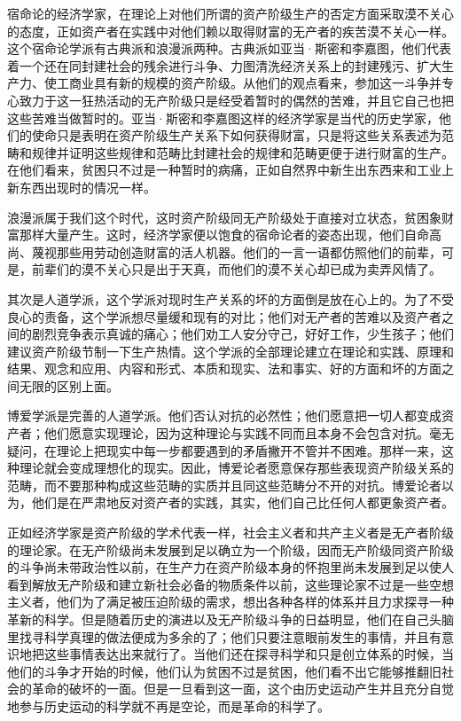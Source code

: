 \documentclass[a4paper,twoside,12pt]{ctexart}
\begin{document}
宿命论的经济学家，在理论上对他们所谓的资产阶级生产的否定方面采取漠不关心的态度，正如资产者在实践中对他们赖以取得财富的无产者的疾苦漠不关心一样。这个宿命论学派有古典派和浪漫派两种。古典派如亚当·斯密和李嘉图，他们代表着一个还在同封建社会的残余进行斗争、力图清洗经济关系上的封建残污、扩大生产力、使工商业具有新的规模的资产阶级。从他们的观点看来，参加这一斗争并专心致力于这一狂热活动的无产阶级只是经受着暂时的偶然的苦难，并且它自己也把这些苦难当做暂时的。亚当·斯密和李嘉图这样的经济学家是当代的历史学家，他们的使命只是表明在资产阶级生产关系下如何获得财富，只是将这些关系表述为范畴和规律并证明这些规律和范畴比封建社会的规律和范畴更便于进行财富的生产。在他们看来，贫困只不过是一种暂时的病痛，正如自然界中新生出东西来和工业上新东西出现时的情况一样。

浪漫派属于我们这个时代，这时资产阶级同无产阶级处于直接对立状态，贫困象财富那样大量产生。这时，经济学家便以饱食的宿命论者的姿态出现，他们自命高尚、蔑视那些用劳动创造财富的活人机器。他们的一言一语都仿照他们的前辈，可是，前辈们的漠不关心只是出于天真，而他们的漠不关心却已成为卖弄风情了。

其次是人道学派，这个学派对现时生产关系的坏的方面倒是放在心上的。为了不受良心的责备，这个学派想尽量缓和现有的对比；他们对无产者的苦难以及资产者之间的剧烈竞争表示真诚的痛心；他们劝工人安分守己，好好工作，少生孩子；他们建议资产阶级节制一下生产热情。这个学派的全部理论建立在理论和实践、原理和结果、观念和应用、内容和形式、本质和现实、法和事实、好的方面和坏的方面之间无限的区别上面。

博爱学派是完善的人道学派。他们否认对抗的必然性；他们愿意把一切人都变成资产者；他们愿意实现理论，因为这种理论与实践不同而且本身不会包含对抗。毫无疑问，在理论上把现实中每一步都要遇到的矛盾撇开不管并不困难。那样一来，这种理论就会变成理想化的现实。因此，博爱论者愿意保存那些表现资产阶级关系的范畴，而不要那种构成这些范畴的实质并且同这些范畴分不开的对抗。博爱论者以为，他们是在严肃地反对资产者的实践，其实，他们自己比任何人都更象资产者。

正如经济学家是资产阶级的学术代表一样，社会主义者和共产主义者是无产者阶级的理论家。在无产阶级尚未发展到足以确立为一个阶级，因而无产阶级同资产阶级的斗争尚未带政治性以前，在生产力在资产阶级本身的怀抱里尚未发展到足以使人看到解放无产阶级和建立新社会必备的物质条件以前，这些理论家不过是一些空想主义者，他们为了满足被压迫阶级的需求，想出各种各样的体系并且力求探寻一种革新的科学。但是随着历史的演进以及无产阶级斗争的日益明显，他们在自己头脑里找寻科学真理的做法便成为多余的了；他们只要注意眼前发生的事情，并且有意识地把这些事情表达出来就行了。当他们还在探寻科学和只是创立体系的时候，当他们的斗争才开始的时候，他们认为贫困不过是贫困，他们看不出它能够推翻旧社会的革命的破坏的一面。但是一旦看到这一面，这个由历史运动产生并且充分自觉地参与历史运动的科学就不再是空论，而是革命的科学了。
\end{document}
